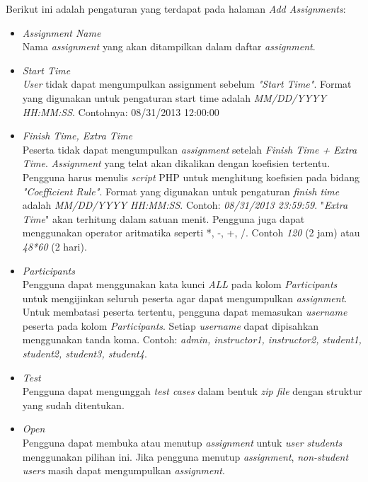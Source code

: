 Berikut ini adalah pengaturan yang terdapat pada halaman \textit{Add Assignments}:
\begin{itemize}
	\item \textit{Assignment Name} \\
	Nama \textit{assignment} yang akan ditampilkan dalam daftar \textit{assignment}.
	
	\item \textit{Start Time} \\
	\textit{User} tidak dapat mengumpulkan assignment sebelum \textit{"Start Time"}. Format yang digunakan untuk pengaturan start time adalah \textit{MM/DD/YYYY HH:MM:SS}. Contohnya: 08/31/2013 12:00:00
	
	\item \textit{Finish Time, Extra Time} \\
	Peserta tidak dapat mengumpulkan \textit{assignment} setelah \textit{Finish Time + Extra Time}. \textit{Assignment} yang telat akan dikalikan dengan koefisien tertentu. Pengguna harus menulis \textit{script} PHP untuk menghitung koefisien pada bidang \textit{"Coefficient Rule"}. Format yang digunakan untuk pengaturan \textit{finish time} adalah \textit{MM/DD/YYYY HH:MM:SS}. Contoh: \textit{08/31/2013 23:59:59}. "\textit{Extra Time}" akan terhitung dalam satuan menit. Pengguna juga dapat menggunakan operator aritmatika seperti *, -, +, /. Contoh \textit{120} (2 jam) atau \textit{48*60} (2 hari).
	
	\item \textit{Participants} \\
	Pengguna dapat menggunakan kata kunci \textit{ALL} pada kolom \textit{Participants} untuk mengijinkan seluruh peserta agar dapat mengumpulkan \textit{assignment}. Untuk membatasi peserta tertentu, pengguna dapat memasukan \textit{username} peserta pada kolom \textit{Participants}. Setiap \textit{username} dapat dipisahkan menggunakan tanda koma. Contoh: \textit{admin, instructor1, instructor2, student1, student2, student3, student4}.
	
	\item \textit{Test} \\
	Pengguna dapat mengunggah \textit{test cases} dalam bentuk \textit{zip file} dengan struktur yang sudah ditentukan.
	
	\item \textit{Open} \\
	Pengguna dapat membuka atau menutup \textit{assignment} untuk \textit{user students} menggunakan pilihan ini. Jika pengguna menutup \textit{assignment}, \textit{non-student users} masih dapat mengumpulkan \textit{assignment}.
	

\end{itemize}
